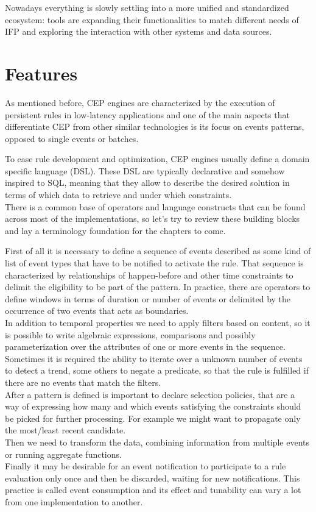 Nowadays everything is slowly settling into a more unified and standardized ecosystem: tools are expanding their functionalities to match different needs of IFP and exploring the interaction with other systems and data sources.

\section{Features}
As mentioned before, CEP engines are characterized by the execution of persistent rules in low-latency applications and one of the main aspects that differentiate CEP from other similar technologies is its focus on events patterns, opposed to single events or batches.

To ease rule development and optimization, CEP engines usually define a domain specific language (DSL). These DSL are typically declarative and somehow inspired to SQL, meaning that they allow to describe the desired solution in terms of which data to retrieve and under which constraints.\\
There is a common base of operators and language constructs that can be found across most of the implementations, so let's try to review these building blocks and lay a terminology foundation for the chapters to come.

First of all it is necessary to define a sequence of events described as some kind of list of event types that have to be notified to activate the rule. That sequence is characterized by relationships of happen-before and other time constraints to delimit the eligibility to be part of the pattern. In practice, there are operators to define windows in terms of duration or number of events or delimited by the occurrence of two events that acts as boundaries.\\
In addition to temporal properties we need to apply filters based on content, so it is possible to write algebraic expressions, comparisons and possibly parameterization over the attributes of one or more events in the sequence.\\
Sometimes it is required the ability to iterate over a unknown number of events to detect a trend, some others to negate a predicate, so that the rule is fulfilled if there are no events that match the filters.\\
After a pattern is defined is important to declare selection policies, that are a way of expressing how many and which events satisfying the constraints should be picked for further processing. For example we might want to propagate only the most/least recent candidate.\\
Then we need to transform the data, combining information from multiple events or running aggregate functions.\\
Finally it may be desirable for an event notification to participate to a rule evaluation only once and then be discarded, waiting for new notifications. This practice is called event consumption and its effect and tunability can vary a lot from one implementation to another.

